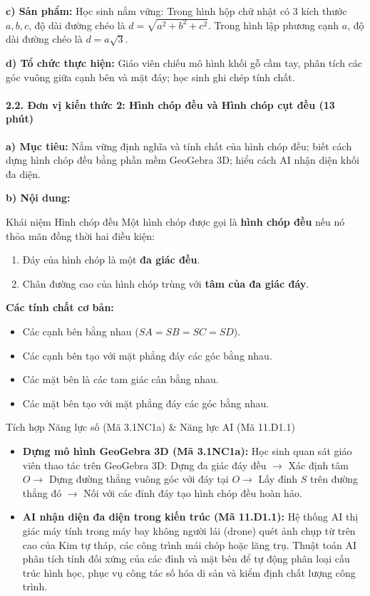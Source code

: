 \documentclass[12pt, a4paper]{article}
\begin{document}
\noindent \textbf{c) Sản phẩm:}
Học sinh nắm vững: Trong hình hộp chữ nhật có 3 kích thước $a, b, c$, độ dài đường chéo là $d = \sqrt{a^2 + b^2 + c^2}$. Trong hình lập phương cạnh $a$, độ dài đường chéo là $d = a\sqrt{3}$.

\noindent \textbf{d) Tổ chức thực hiện:}
Giáo viên chiếu mô hình khối gỗ cầm tay, phân tích các góc vuông giữa cạnh bên và mặt đáy; học sinh ghi chép tính chất.

\paragraph{2.2. Đơn vị kiến thức 2: Hình chóp đều và Hình chóp cụt đều (13 phút)}

\noindent \textbf{a) Mục tiêu:}
Nắm vững định nghĩa và tính chất của hình chóp đều; biết cách dựng hình chóp đều bằng phần mềm GeoGebra 3D; hiểu cách AI nhận diện khối đa diện.

\noindent \textbf{b) Nội dung:}
\begin{pedabox}{Khái niệm Hình chóp đều}
Một hình chóp được gọi là \textbf{hình chóp đều} nếu nó thỏa mãn đồng thời hai điều kiện:
\begin{enumerate}[leftmargin=0.6cm]
    \item Đáy của hình chóp là một \textbf{đa giác đều}.
    \item Chân đường cao của hình chóp trùng với \textbf{tâm của đa giác đáy}.
\end{enumerate}
\textbf{Các tính chất cơ bản:}
\begin{itemize}[leftmargin=0.6cm]
    \item Các cạnh bên bằng nhau ($SA = SB = SC = SD$).
    \item Các cạnh bên tạo với mặt phẳng đáy các góc bằng nhau.
    \item Các mặt bên là các tam giác cân bằng nhau.
    \item Các mặt bên tạo với mặt phẳng đáy các góc bằng nhau.
\end{itemize}
\end{pedabox}

\begin{aibox}{Tích hợp Năng lực số (Mã 3.1NC1a) \& Năng lực AI (Mã 11.D1.1)}
\begin{itemize}[leftmargin=0.6cm]
    \item \textbf{Dựng mô hình GeoGebra 3D (Mã 3.1NC1a):} Học sinh quan sát giáo viên thao tác trên GeoGebra 3D: Dựng đa giác đáy đều $\to$ Xác định tâm $O \to$ Dựng đường thẳng vuông góc với đáy tại $O \to$ Lấy đỉnh $S$ trên đường thẳng đó $\to$ Nối với các đỉnh đáy tạo hình chóp đều hoàn hảo.
    \item \textbf{AI nhận diện đa diện trong kiến trúc (Mã 11.D1.1):} Hệ thống AI thị giác máy tính trong máy bay không người lái (drone) quét ảnh chụp từ trên cao của Kim tự tháp, các công trình mái chóp hoặc lăng trụ. Thuật toán AI phân tích tính đối xứng của các đỉnh và mặt bên để tự động phân loại cấu trúc hình học, phục vụ công tác số hóa di sản và kiểm định chất lượng công trình.
\end{itemize}
\end{aibox}
\end{document}
